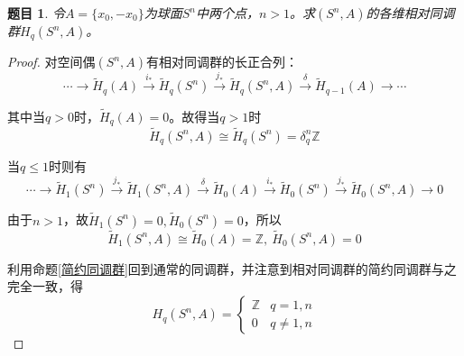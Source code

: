 \documentclass[UTF-8,11pt,fancyhdr,hyperref,titlepage]{ctexart}
\theoremstyle{question}
\newtheorem{timu}{题目}
\theoremstyle{theorem}
\theoremstyle{definition}
\theoremstyle{remark}
\def\ZZ{{\mathbb Z}}
\def\longto{\longrightarrow}
\def\To{\longto}
\newcommand{\markar}[1]{\stackrel{{#1}}{\longrightarrow}}%
\newcommand{\rH}[1]{\widetilde{H}_{#1}}
\begin{document}
\begin{timu}\label{26}
  令$A=\{x_0,-x_0\}$为球面$S^n$中两个点，$n>1$。求$(S^n,A)$的各维相对同调群$H_q(S^n,A)$。
\end{timu}
\begin{proof}
  对空间偶$(S^n,A)$有相对同调群的长正合列：
  \begin{equation*}
    \cdots\To \rH{q}(A) \markar{i_{\ast}} \rH{q}(S^n) \markar{j_{\ast}} \rH{q}(S^n,A) \markar{\delta} \rH{q-1}(A) \To \cdots
  \end{equation*}
  
  其中当$q>0$时，$\rH{q}(A)=0$。故得当$q>1$时
  \begin{equation*}
    \rH{q}(S^n,A)\cong \rH{q}(S^n)=\delta_q^n\ZZ
  \end{equation*}

  当$q\leqslant1$时则有
  \begin{equation*}
    \cdots\To \rH{1}(S^n) \markar{j_{\ast}} \rH{1}(S^n,A) \markar{\delta} \rH{0}(A) \markar{i_{\ast}} \rH{0}(S^n) \markar{j_{\ast}} \rH{0}(S^n,A) \To 0
  \end{equation*}

  由于$n>1$，故$\rH{1}(S^n)=0, \rH{0}(S^n)=0$，所以
  \begin{equation*}
    \rH{1}(S^n,A)\cong \rH{0}(A) =\ZZ, \  \rH{0}(S^n,A)=0
  \end{equation*}

   利用命题\ref{简约同调群}回到通常的同调群，并注意到相对同调群的简约同调群与之完全一致，得
   \begin{equation*}
     H_q(S^n,A)=
     \begin{cases}
       \ZZ & q=1,n\\
       0 & q\neq 1,n
     \end{cases}
   \end{equation*}
\end{proof}
\end{document}
